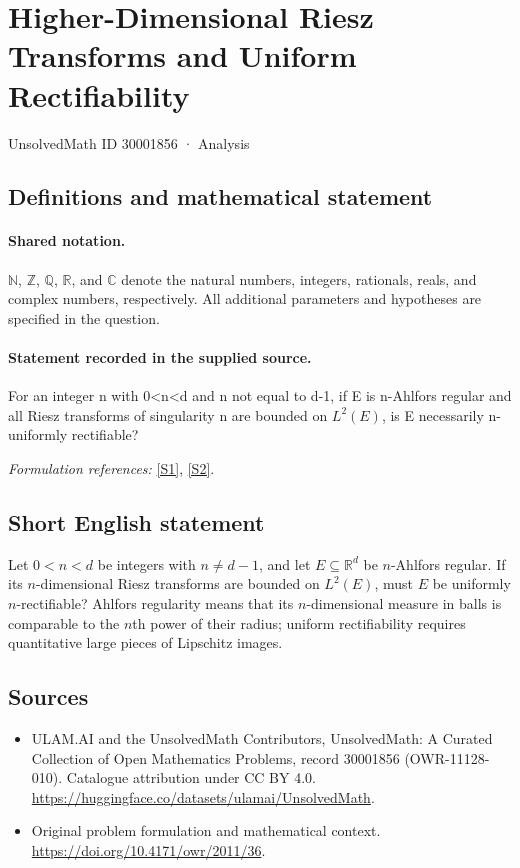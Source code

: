 \documentclass[11pt]{article}
\newcommand{\sref}[2]{\hyperlink{source:#1:#2}{[S#2]}}
\begin{document}
\setcounter{section}{30001855}
\section{Higher-Dimensional Riesz Transforms and Uniform Rectifiability}\label{30001856}
{\small UnsolvedMath ID 30001856 · Analysis}
\subsection{Definitions and mathematical statement}

\paragraph{Shared notation.}$\mathbb N$, $\mathbb Z$, $\mathbb Q$, $\mathbb R$, and $\mathbb C$ denote the natural numbers, integers, rationals, reals, and complex numbers, respectively. All additional parameters and hypotheses are specified in the question.


\paragraph{Statement recorded in the supplied source.}
For an integer n with 0<n<d and n not equal to d-1, if E is n-Ahlfors regular and all Riesz transforms of singularity n are bounded on $L^2(E)$, is E necessarily n-uniformly rectifiable?
\par\smallskip\textit{Formulation references:} \sref{30001856}{1}, \sref{30001856}{2}.
\subsection{Short English statement}
Let $0<n<d$ be integers with $n\neq d-1$, and let $E\subseteq\mathbb R^d$ be $n$-Ahlfors regular. If its $n$-dimensional Riesz transforms are bounded on $L^2(E)$, must $E$ be uniformly $n$-rectifiable? Ahlfors regularity means that its $n$-dimensional measure in balls is comparable to the $n$th power of their radius; uniform rectifiability requires quantitative large pieces of Lipschitz images.
\subsection{Sources}
\begin{itemize}
\item[\hypertarget{source:30001856:1}{S1}] ULAM.AI and the UnsolvedMath Contributors, UnsolvedMath: A Curated Collection of Open Mathematics Problems, record 30001856 (OWR-11128-010). Catalogue attribution under CC BY 4.0.
\url{https://huggingface.co/datasets/ulamai/UnsolvedMath}.
\item[\hypertarget{source:30001856:2}{S2}] Original problem formulation and mathematical context.
\url{https://doi.org/10.4171/owr/2011/36}.
\end{itemize}
\label{end:30001856}
\end{document}
